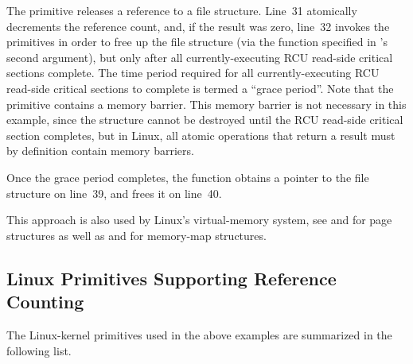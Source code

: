 The  primitive releases a reference to a file structure.
Line~31 atomically decrements the reference count, and, if the result
was zero, line~32 invokes the  primitives in order to
free up the file structure (via the  function
specified in 's second argument),
but only after all currently-executing
RCU read-side critical sections complete.
The time period required for all currently-executing RCU read-side
critical sections to complete is termed a ``grace period''.
Note that the  primitive contains
a memory barrier.
This memory barrier is not necessary in this example, since the structure
cannot be destroyed until the RCU read-side critical section completes,
but in Linux, all atomic operations that return a result must
by definition contain memory barriers.

Once the grace period completes, the  function
obtains a pointer to the file structure on line~39, and frees it
on line~40.

This approach is also used by Linux's virtual-memory system,
see  and  for
page structures as well as  and 
for memory-map structures.

\subsection{Linux Primitives Supporting Reference Counting}
\label{sec:defer:Linux Primitives Supporting Reference Counting}

The Linux-kernel primitives used in the above examples are
summarized in the following list.

